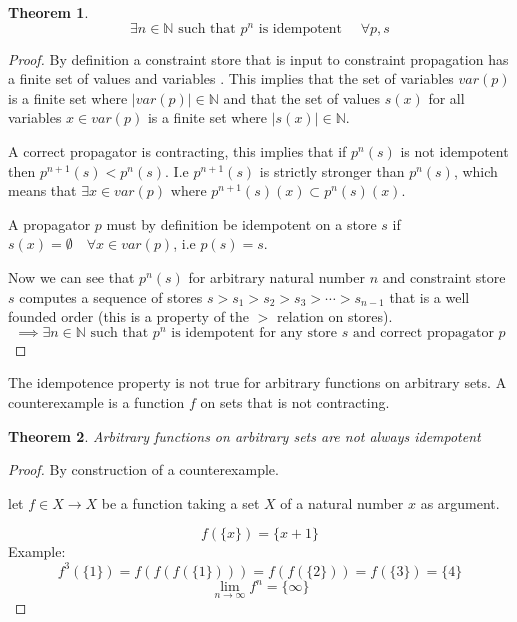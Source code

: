\documentclass[a4paper, 11pt]{article}
\newtheorem{theorem}{Theorem}[section]
\begin{document}
\begin{theorem}
  $$\exists n \in \mathbb{N} \text{ such that } p^n \text{ is idempotent } \quad \forall p,s$$
\end{theorem}
\begin{proof}
By definition a constraint store that is input to constraint propagation has a finite set of values and variables \citep{schulte_notes}. This implies that the set of variables $var(p)$ is a finite set where $|var(p)| \in \mathbb{N}$ and that the set of values $s(x)$ for all variables $x \in var(p)$ is a finite set where $|s(x)| \in \mathbb{N}$.

A correct propagator is contracting, this implies that if $p^n(s)$ is not idempotent then $p^{n+1}(s) < p^n(s)$. I.e $p^{n+1}(s)$ is strictly stronger than $p^n(s)$, which means that $\exists x \in var(p) \text{ where } p^{n+1}(s)(x) \subset p^{n}(s)(x)$.

A propagator $p$ must by definition be idempotent on a store $s$ if $s(x) = \emptyset \quad \forall x \in var(p)$, i.e $p(s) = s$.

Now we can see that $p^n(s)$ for arbitrary natural number $n$ and constraint store $s$ computes a sequence of stores $s > s_1 > s_2 > s_3 > \cdots > s_{n-1}$ that is a well founded order (this is a property of the $>$ relation on stores\citep{schulte_notes}).
  $$\implies \exists n \in \mathbb{N} \text{ such that } p^n \text{ is idempotent for any store } s \text{ and correct propagator }p$$
\end{proof}

The idempotence property is not true for arbitrary functions on arbitrary sets. A counterexample is a function $f$ on sets that is not contracting.

\begin{theorem}
Arbitrary functions on arbitrary sets are not always idempotent
\end{theorem}
\begin{proof}
By construction of a counterexample.

let $f \in X \rightarrow X$ be a function taking a set $X$ of a natural number $x$ as argument.

$$f(\{x\}) = \{x+1\}$$
Example:
$$f^3(\{1\}) = f(f(f(\{1\}))) = f(f(\{2\})) = f(\{3\}) = \{4\}$$
$$\lim_{n\to\infty} f^n = \{\infty\}$$
\end{proof}

{}

\end{document}

